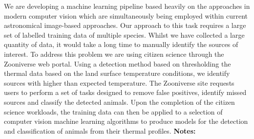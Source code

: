 \documentclass{report}
\begin{document}
{{{{{{{{{{{{{{{{{{{{{{{{{{{{{{{{{{{{{{{{{{{{{{{{{{{{{{{{{{{{{{{{{{{{{{{{{{{{{{{{{{{{{{{{{{{{{{{{{{{{{{{{{{{{{{{{{{{{{{We are developing a machine learning pipeline based heavily on the approaches in modern computer vision which are simultaneously being employed within current astronomical image-based approaches. Our approach to this task requires a large set of labelled training data of multiple species. Whilst we have collected a large quantity of data, it would take a long time to manually identify the sources of interest. To address this problem we are using citizen science through the Zooniverse web portal. Using a detection method based on thresholding the thermal data based on the land surface temperature conditions, we identify sources with higher than expected temperature. The Zooniverse site requests users to perform a set of tasks designed to remove false positives, identify missed sources and classify the detected animals. Upon the completion of the citizen science workloads, the training data can then be applied to a selection of computer vision machine learning algorithms to produce models for the detection and classification of animals from their thermal profiles.\newline
{\bf Notes:}\newline
{\newpage
}}}}}}}}}}}}}}}}}}}}}}}}}}}}}}}}}}}}}}}}}}}}}}}}}}}}}}}}}}}}}}}}}}}}}}}}}}}}}}}}}}}}}}}}}}}}}}}}}}}}}}}}}}}}}}}}}}}}}}}
\end{document}
